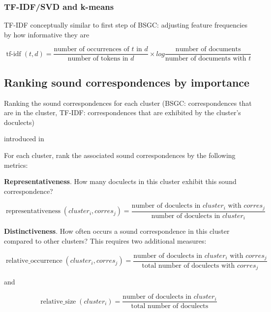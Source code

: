 \documentclass{article}
\begin{document}
\subsubsection{TF-IDF/SVD and k-means}

TF-IDF conceptually similar to first step of BSGC: adjusting feature frequencies by how informative they are

\begin{equation*}
\operatorname{tf-idf}(t, d) =
\frac{\text{number of occurrences of } t \text{ in } d}
{\text{number of tokens in } d}
\times
log
\frac{\text{number of documents}}
{\text{number of documents with } t}
\end{equation*}

\subsection{Ranking sound correspondences by importance}

Ranking the sound correspondences for each cluster
(BSGC: correspondences that are in the cluster,
TF-IDF: correspondences that are exhibited by the cluster's doculects)

introduced in \citet{wieling2011bipartite}

For each cluster, rank the associated sound correspondences by the following metrics:

\textbf{Representativeness}.
How many doculects in this cluster exhibit this sound correspondence?

\begin{equation*}
\operatorname{representativeness}(cluster_i, corres_j) = 
\frac{\text{number of doculects in } cluster_i \text{ with }  corres_j}
{\text{number of doculects in }  cluster_i}
\end{equation*}

\textbf{Distinctiveness}.
How often occurs a sound correspondence in this cluster compared to other clusters? 
This requires two additional measures: 

\begin{equation*}
\operatorname{relative\_occurrence}(cluster_i, corres_j) = 
\frac{\text{number of doculects in } cluster_i \text{ with }  corres_j}
{\text{total number of doculects with } corres_j}
\end{equation*}

and

\begin{equation*}
\operatorname{relative\_size}(cluster_i) = 
\frac{\text{number of doculects in } cluster_i}
{\text{total number of doculects}}
\end{equation*}
\end{document}
